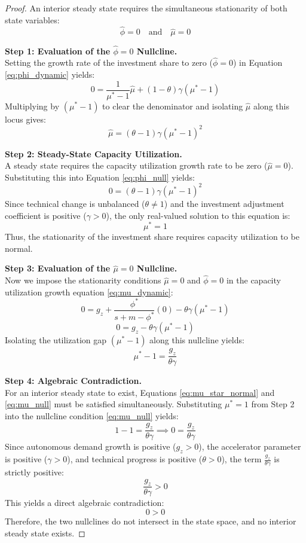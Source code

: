 \documentclass[12pt, a4paper]{article}
\theoremstyle{definition}
\theoremstyle{remark}
\begin{document}
\begin{proof}
An interior steady state requires the simultaneous stationarity of both state variables:
\[
\hat{\phi} = 0 \quad \text{and} \quad \hat{\mu} = 0
\]

\textbf{Step 1: Evaluation of the $\hat{\phi} = 0$ Nullcline.} \\
Setting the growth rate of the investment share to zero ($\hat{\phi} = 0$) in Equation \eqref{eq:phi_dynamic} yields:
\[
0 = \frac{1}{\mu^* - 1}\hat{\mu} + (1 - \theta)\gamma(\mu^* - 1)
\]
Multiplying by $(\mu^* - 1)$ to clear the denominator and isolating $\hat{\mu}$ along this locus gives:
\begin{equation} \label{eq:phi_null}
    \hat{\mu} = (\theta - 1)\gamma(\mu^* - 1)^2
\end{equation}

\textbf{Step 2: Steady-State Capacity Utilization.} \\
A steady state requires the capacity utilization growth rate to be zero ($\hat{\mu} = 0$). Substituting this into Equation \eqref{eq:phi_null} yields:
\[
0 = (\theta - 1)\gamma(\mu^* - 1)^2
\]
Since technical change is unbalanced ($\theta \neq 1$) and the investment adjustment coefficient is positive ($\gamma > 0$), the only real-valued solution to this equation is:
\begin{equation} \label{eq:mu_star_normal}
    \mu^* = 1
\end{equation}
Thus, the stationarity of the investment share requires capacity utilization to be normal.

\textbf{Step 3: Evaluation of the $\hat{\mu} = 0$ Nullcline.} \\
Now we impose the stationarity conditions $\hat{\mu} = 0$ and $\hat{\phi} = 0$ in the capacity utilization growth equation \eqref{eq:mu_dynamic}:
\[
0 = g_z + \frac{\phi^*}{s + m - \phi^*}(0) - \theta\gamma(\mu^* - 1)
\]
$$ 0 = g_z - \theta\gamma(\mu^* - 1) $$
Isolating the utilization gap $(\mu^* - 1)$ along this nullcline yields:
\begin{equation} \label{eq:mu_null}
    \mu^* - 1 = \frac{g_z}{\theta\gamma}
\end{equation}

\textbf{Step 4: Algebraic Contradiction.} \\
For an interior steady state to exist, Equations \eqref{eq:mu_star_normal} and \eqref{eq:mu_null} must be satisfied simultaneously. Substituting $\mu^* = 1$ from Step 2 into the nullcline condition \eqref{eq:mu_null} yields:
\[
1 - 1 = \frac{g_z}{\theta\gamma} \implies 0 = \frac{g_z}{\theta\gamma}
\]
Since autonomous demand growth is positive ($g_z > 0$), the accelerator parameter is positive ($\gamma > 0$), and technical progress is positive ($\theta > 0$), the term $\frac{g_z}{\theta\gamma}$ is strictly positive:
\[
\frac{g_z}{\theta\gamma} > 0
\]
This yields a direct algebraic contradiction:
\[
0 > 0
\]
Therefore, the two nullclines do not intersect in the state space, and no interior steady state exists.


\end{proof}
\end{document}

